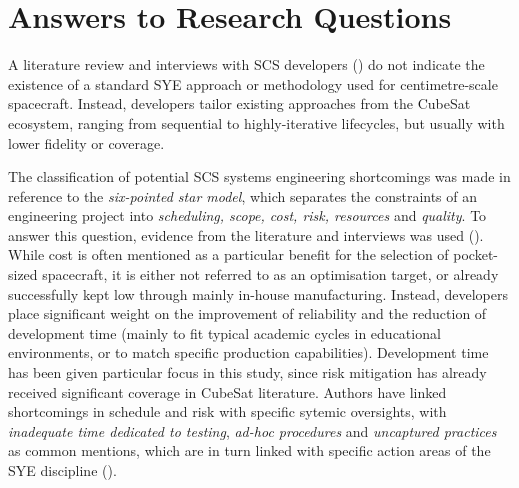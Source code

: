 \documentclass[a4paper,nobib,justified,final]{tufte-book}
\begin{document}
\FloatBarrier
\newpage
\section{Answers to Research Questions}
\label{sec:DISCUSSION_rq_answers}


\begin{fullwidth}

A literature review and interviews with \acs{SCS} developers () do not indicate the existence of a standard \acl{SYE} approach or methodology used for centimetre-scale spacecraft.
Instead, developers tailor existing approaches from the CubeSat ecosystem, ranging from sequential to highly-iterative lifecycles, but usually with lower fidelity or coverage.


The classification of potential \acs{SCS} systems engineering shortcomings was made in reference to the \emph{six-pointed star model}, which separates the constraints of an engineering project into \emph{scheduling, scope, cost, risk, resources} and \emph{quality}. To answer this question, evidence from the literature and interviews was used (). While cost is often mentioned as a particular benefit for the selection of pocket-sized spacecraft, it is either not referred to as an optimisation target, or already successfully kept low through mainly in-house manufacturing. Instead, developers place significant weight on the improvement of reliability and the reduction of development time (mainly to fit typical academic cycles in educational environments, or to match specific production capabilities). Development time has been given particular focus in this study, since risk mitigation has already received significant coverage in CubeSat literature. Authors have linked shortcomings in schedule and risk with specific sytemic oversights, with \emph{inadequate time dedicated to testing}, \emph{ad-hoc procedures} and \emph{uncaptured practices} as common mentions, which are in turn linked with specific action areas of the \acl{SYE} discipline ().


\end{fullwidth}
\end{document}
